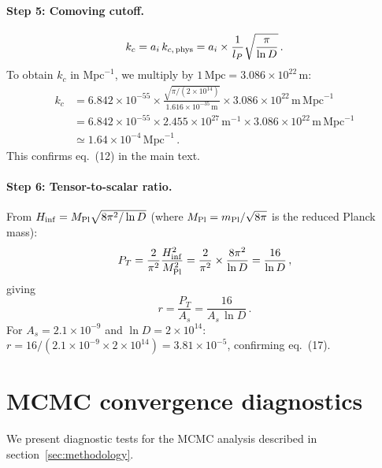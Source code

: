 \paragraph{Step 5: Comoving cutoff.}
\begin{equation}
  k_c = a_i\,k_{c,\,\rm phys}
  = a_i \times \frac{1}{l_P}\sqrt{\frac{\pi}{\ln D}}\,.
\end{equation}
To obtain $k_c$ in $\mathrm{Mpc}^{-1}$, we multiply by
$1\,\mathrm{Mpc} = 3.086\times 10^{22}\,\mathrm{m}$:
\begin{align}
  k_c &= 6.842\times 10^{-55} \times
  \frac{\sqrt{\pi/(2\times 10^{14})}}{1.616\times 10^{-35}\,\mathrm{m}}
  \times 3.086\times 10^{22}\,\mathrm{m}\,\mathrm{Mpc}^{-1} \nonumber\\
  &= 6.842\times 10^{-55} \times 2.455\times 10^{27}\,\mathrm{m}^{-1}
  \times 3.086\times 10^{22}\,\mathrm{m}\,\mathrm{Mpc}^{-1} \nonumber\\
  &\simeq 1.64\times 10^{-4}\,\mathrm{Mpc}^{-1}\,.
\end{align}
This confirms eq.~(12) in the main text.

\paragraph{Step 6: Tensor-to-scalar ratio.}
From $H_{\rm inf} = M_{\rm Pl}\sqrt{8\pi^2/\ln D}$ (where
$M_{\rm Pl} = m_{\rm Pl}/\sqrt{8\pi}$ is the reduced Planck mass):
\begin{equation}
  P_T = \frac{2}{\pi^2}\frac{H_{\rm inf}^2}{M_{\rm Pl}^2}
  = \frac{2}{\pi^2}\times\frac{8\pi^2}{\ln D}
  = \frac{16}{\ln D}\,,
\end{equation}
giving
\begin{equation}
  r = \frac{P_T}{A_s} = \frac{16}{A_s\,\ln D}\,.
\end{equation}
For $A_s = 2.1\times 10^{-9}$ and $\ln D = 2\times 10^{14}$:
$r = 16/(2.1\times 10^{-9}\times 2\times 10^{14}) = 3.81\times 10^{-5}$,
confirming eq.~(17).


\section{MCMC convergence diagnostics}
\label{app:convergence}

We present diagnostic tests for the MCMC analysis described in
section~\ref{sec:methodology}.

